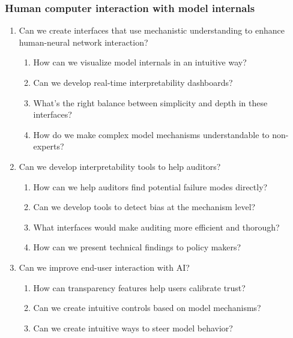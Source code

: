 \subsubsection{Human computer interaction with model internals}
\begin{enumerate}
    \item Can we create interfaces that use mechanistic understanding to enhance human-neural network interaction?
    \begin{enumerate}[label=\alph*.]
        \item How can we visualize model internals in an intuitive way?
        \item Can we develop real-time interpretability dashboards?
        \item What's the right balance between simplicity and depth in these interfaces?
        \item How do we make complex model mechanisms understandable to non-experts?
    \end{enumerate}
    
    \item Can we develop interpretability tools to help auditors?
    \begin{enumerate}[label=\alph*.]
        \item How can we help auditors find potential failure modes directly?
        \item Can we develop tools to detect bias at the mechanism level?
        \item What interfaces would make auditing more efficient and thorough?
        \item How can we present technical findings to policy makers?
    \end{enumerate}
    
    \item Can we improve end-user interaction with AI?
    \begin{enumerate}[label=\alph*.]
        \item How can transparency features help users calibrate trust?
        \item Can we create intuitive controls based on model mechanisms?
        \item Can we create intuitive ways to steer model behavior?
    \end{enumerate}
\end{enumerate}


